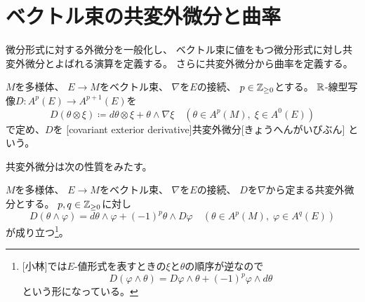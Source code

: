 \documentclass[report]{jlreq}
\begin{document}
\begin{definition}[引き戻し束の接続]
    \TODO{}
\end{definition}

%
\section{ベクトル束の共変外微分と曲率}

微分形式に対する外微分を一般化し、
ベクトル束に値をもつ微分形式に対し共変外微分とよばれる演算を定義する。
さらに共変外微分から曲率を定義する。

\begin{definition}[共変外微分]
    $M$を多様体、
    $E \to M$をベクトル束、
    $\nabla$を$E$の接続、
    $p \in \mathbb{Z}_{\ge 0}$とする。
    $\mathbb{R}$-線型写像$D \colon A^p(E) \to A^{p + 1}(E)$を
    \begin{equation}
        D(\theta \otimes \xi)
            \coloneqq d\theta \otimes \xi + \theta \wedge \nabla\xi
            \quad (\theta \in A^p(M), \; \xi \in A^0(E))
    \end{equation}
    で定め、$D$を
    [covariant exterior derivative]{共変外微分}[きょうへんがいびぶん]
    という。
\end{definition}


共変外微分は次の性質をみたす。

\begin{proposition}
    $M$を多様体、
    $E \to M$をベクトル束、
    $\nabla$を$E$の接続、
    $D$を$\nabla$から定まる共変外微分とする。
    $p, q \in \mathbb{Z}_{\ge 0}$に対し
    \begin{equation}
        D(\theta \wedge \varphi)
            = d\theta \wedge \varphi + (-1)^p \theta \wedge D\varphi
            \quad
            (\theta \in A^p(M), \; \varphi \in A^q(E))
    \end{equation}
    が成り立つ\footnote{
        [小林]では$E$-値形式を表すときの$\xi$と$\theta$の順序が逆なので
        \begin{equation}
            D(\varphi \wedge \theta)
                = D\varphi \wedge \theta + (-1)^p \varphi \wedge d\theta
        \end{equation}
        という形になっている。
    }。
\end{proposition}
\end{document}
